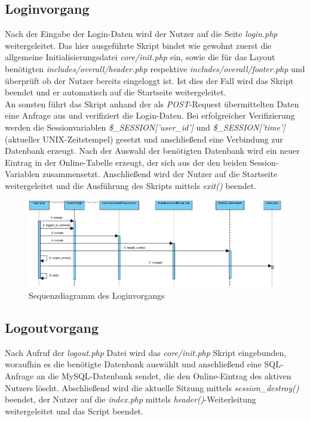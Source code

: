 \documentclass[fontsize = 12pt, paper = a4]{scrreprt}
\begin{document}
\newpage
\subsection{Loginvorgang}
Nach der Eingabe der Login-Daten wird der Nutzer auf die Seite \textit{login.php} weitergeleitet. Das hier ausgeführte Skript bindet wie gewohnt zuerst die allgemeine Initialisierungsdatei \textit{core/init.php} ein, sowie die für das Layout benötigten \textit{includes/overall/header.php} respektive \textit{includes/overall/footer.php} und überprüft ob der Nutzer bereits eingeloggt ist. Ist dies der Fall wird das Skript beendet und er automatisch auf die Startseite weitergeleitet.\\
An sonsten führt das Skript anhand der als \textit{POST}-Request übermittelten Daten eine Anfrage aus und verifiziert die Login-Daten. Bei erfolgreicher Verifizierung werden die Sessionvariablen \textit{\$\_SESSION['user\_id']} und \textit{\$\_SESSION['time']} (aktueller UNIX-Zeitstempel) gesetzt und anschließend eine Verbindung zur Datenbank erzeugt. Nach der Auswahl der benötigten Datenbank wird ein neuer Eintrag in der Online-Tabelle erzeugt, der sich aus der den beiden Session-Variablen zusammensetzt. Anschließend wird der Nutzer auf die Startseite weitergeleitet und die Ausführung des Skripts mittels \textit{exit()} beendet.\\

\begin{figure}[h]
\centering
\includegraphics[scale = 0.5]{login}
\caption[Sequenzdiagramm des Loginvorgangs]{Sequenzdiagramm des Loginvorgangs}
\label{login}
\end{figure}

\newpage
\subsection{Logoutvorgang}
Nach Aufruf der \textit{logout.php} Datei wird das \textit{core/init.php} Skript eingebunden, woraufhin es die benötigte Datenbank auswählt und anschließend eine SQL-Anfrage an die MySQL-Datenbank sendet, die den \glqq Online\grqq-Eintrag des aktiven Nutzers löscht. Abschließend wird die aktuelle Sitzung mittels \textit{session\_destroy()} beendet, der Nutzer auf die \textit{index.php} mittels \textit{header()}-Weiterleitung weitergeleitet und das Script beendet.
\end{document}
